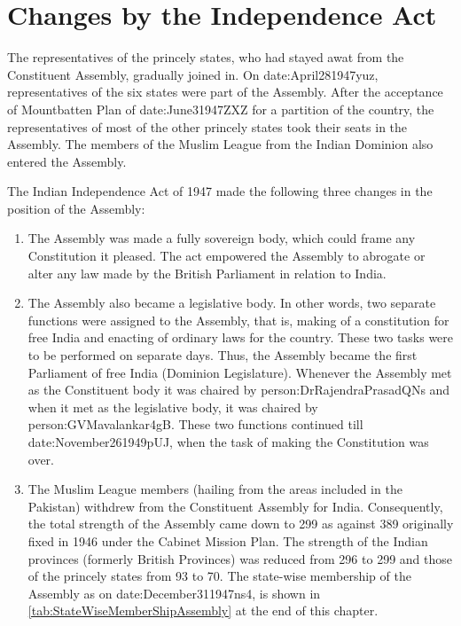 \section{Changes by the Independence Act}

The representatives of the princely states, who had stayed awat from the Constituent Assembly, gradually joined in. On \gls{date:April281947yuz}, representatives of the six states were part of the Assembly. After the acceptance of Mountbatten Plan of \gls{date:June31947ZXZ} for a partition of the country, the representatives of most of the other princely states took their seats in the Assembly. The members of the Muslim League from the Indian Dominion also entered the Assembly.

The Indian Independence Act of 1947 made the following three changes in the position of the Assembly:

\begin{enumerate}
  \item The Assembly was made a fully sovereign body, which could frame any Constitution it pleased. The act empowered the Assembly to abrogate or alter any law made by the British Parliament in relation to India.
  \item The Assembly also became a legislative body. In other words, two separate functions were assigned to the Assembly, that is, making of a constitution for free India and enacting of ordinary laws for the country. These two tasks were to be performed on separate days. Thus, the Assembly became the first Parliament of free India (Dominion Legislature). Whenever the Assembly met as the Constituent body it was chaired by \gls{person:DrRajendraPrasadQNs} and when it met as the legislative body, it was chaired by \gls{person:GVMavalankar4gB}. These two functions continued till \gls{date:November261949pUJ}, when the task of making the Constitution was over.
  \item The Muslim League members (hailing from the areas included in the Pakistan) withdrew from the Constituent Assembly for India. Consequently, the total strength of the Assembly came down to 299 as against 389 originally fixed in 1946 under the Cabinet Mission Plan. The strength of the Indian provinces (formerly British Provinces) was reduced from 296 to 299 and those of the princely states from 93 to 70. The state-wise membership of the Assembly as on \gls{date:December311947ns4}, is shown in \ref{tab:StateWiseMemberShipAssembly} at the end of this chapter.
\end{enumerate}

